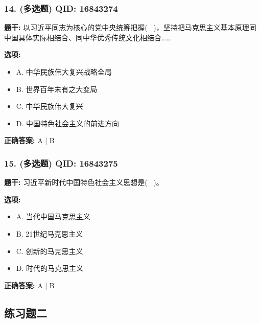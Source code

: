 \documentclass[12pt,UTF8]{ctexart}
\begin{document}
\subsubsection*{14. (多选题) \small QID: 16843274}

\textbf{题干:}
以习近平同志为核心的党中央统筹把握(  )，坚持把马克思主义基本原理同中国具体实际相结合、同中华优秀传统文化相结合……

\textbf{选项:}
\begin{itemize}[leftmargin=*]

  \item A. 中华民族伟大复兴战略全局

  \item B. 世界百年未有之大变局

  \item C. 中华民族伟大复兴

  \item D. 中国特色社会主义的前进方向

\end{itemize}

\textbf{正确答案:}
A | B

\vspace{0.3em}\hrulefill\vspace{0.7em}

\subsubsection*{15. (多选题) \small QID: 16843275}

\textbf{题干:}
习近平新时代中国特色社会主义思想是(  )。

\textbf{选项:}
\begin{itemize}[leftmargin=*]

  \item A. 当代中国马克思主义

  \item B. 21世纪马克思主义

  \item C. 创新的马克思主义

  \item D. 时代的马克思主义

\end{itemize}

\textbf{正确答案:}
A | B

\vspace{0.3em}\hrulefill\vspace{0.7em}

\subsection*{练习题二}
\end{document}
